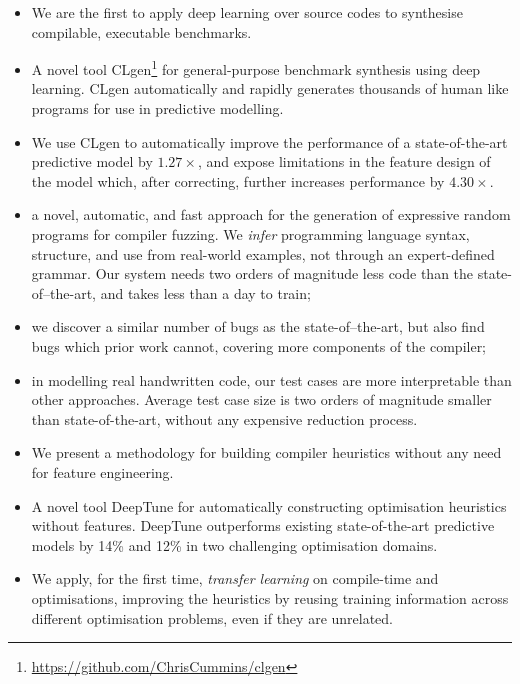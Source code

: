 \begin{itemize}
  \item {} We are the first to apply deep learning over source codes to synthesise compilable, executable benchmarks.%
  \item {} A novel tool CLgen\footnote{\url{https://github.com/ChrisCummins/clgen}} for general-purpose benchmark synthesis using deep learning. CLgen automatically and rapidly generates thousands of human like programs for use in predictive modelling.%
  \item {} We use CLgen to automatically improve the performance of a state-of-the-art predictive model by $1.27\times$, and expose limitations in the feature design of the model which, after correcting, further increases performance by $4.30\times$.%
  \item {} a novel, automatic, and fast approach for the generation of expressive random programs for compiler fuzzing. We \emph{infer} programming language syntax, structure, and use from real-world examples, not through an expert-defined grammar. Our system needs two orders of magnitude less code than the state-of–the-art, and takes less than a day to train;
  \item {} we discover a similar number of bugs as the state-of–the-art, but also find bugs which prior work cannot, covering more components of the compiler;
  \item {} in modelling real handwritten code, our test cases are more interpretable than other approaches. Average test case size is two orders of magnitude smaller than state-of-the-art, without any expensive reduction process.
	\item {} We present a methodology for building compiler heuristics without any need for feature engineering.
	\item {} A novel tool DeepTune for automatically constructing optimisation heuristics without features. DeepTune outperforms existing state-of-the-art predictive models by 14\% and 12\% in two challenging optimisation domains.
	\item {} We apply, for the first time, \emph{transfer learning} on compile-time and optimisations, improving the heuristics by reusing training information across different optimisation problems, even if they are unrelated.
\end{itemize}

